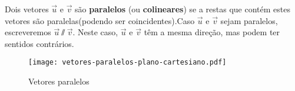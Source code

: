 \begin{definicao}
	Dois vetores $\vec{u}$ e $\vec{v}$ s\~ao \textbf{paralelos} (ou \textbf{colineares}) se a restas que cont\'em estes vetores s\~ao paralelas(podendo ser coincidentes).Caso $\vec{u}$ e $\vec{v}$ sejam paralelos, escreveremos $\vec{u}\varparallel\vec{v}$. Neste caso, $\vec{u}$ e $\vec{v}$ t\^em a mesma dire\c{c}\~ao, mas podem ter sentidos contr\'arios.
\end{definicao}
\begin{figure}[!h]
	\centering
	\caption{Vetores paralelos}
	\texttt{[image: vetores-paralelos-plano-cartesiano.pdf]}
\end{figure}

